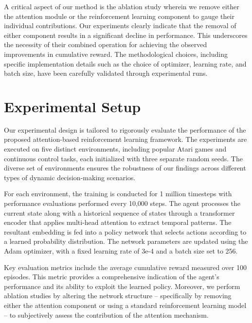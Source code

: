\documentclass{article} %
\begin{document}
A critical aspect of our method is the ablation study wherein we remove either the attention module or the reinforcement learning component to gauge their individual contributions. Our experiments clearly indicate that the removal of either component results in a significant decline in performance. This underscores the necessity of their combined operation for achieving the observed improvements in cumulative reward. The methodological choices, including specific implementation details such as the choice of optimizer, learning rate, and batch size, have been carefully validated through experimental runs.

\section{Experimental Setup}
\label{sec:experimental}
Our experimental design is tailored to rigorously evaluate the performance of the proposed attention-based reinforcement learning framework. The experiments are executed on five distinct environments, including popular Atari games and continuous control tasks, each initialized with three separate random seeds. The diverse set of environments ensures the robustness of our findings across different types of dynamic decision-making scenarios.

For each environment, the training is conducted for 1 million timesteps with performance evaluations performed every 10,000 steps. The agent processes the current state along with a historical sequence of states through a transformer encoder that applies multi-head attention to extract temporal patterns. The resultant embedding is fed into a policy network that selects actions according to a learned probability distribution. The network parameters are updated using the Adam optimizer, with a fixed learning rate of 3e-4 and a batch size set to 256.

Key evaluation metrics include the average cumulative reward measured over 100 episodes. This metric provides a comprehensive indication of the agent’s performance and its ability to exploit the learned policy. Moreover, we perform ablation studies by altering the network structure – specifically by removing either the attention component or using a standard reinforcement learning model – to subjectively assess the contribution of the attention mechanism.
\end{document}
